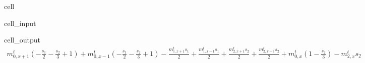 \documentclass[letterpaper,10pt,english,openany,oneside]{jupyterBook}
\begin{document}
\begin{sphinxuseclass}{cell}
\begin{sphinxVerbatimInput}
\begin{sphinxuseclass}{cell_input}
\begin{sphinxVerbatim}[commandchars=\\\{\}]
           \PYG{p}{[}\PYG{p}{]}\PYG{p}{[}\PYG{p}{]}\PYG{p}{[}\PYG{p}{]}\PYG{p}{[}\PYG{p}{]}\PYG{p}{[}\PYG{p}{]}\PYG{p}{[}\PYG{p}{]}
\end{sphinxVerbatim}

\end{sphinxuseclass}\end{sphinxVerbatimInput}
\begin{sphinxVerbatimOutput}

\begin{sphinxuseclass}{cell_output}\begin{equation*}
\begin{split}\displaystyle m^{t}_{0,x+1} \left(- \frac{s_{1}}{2} - \frac{s_{2}}{3} + 1\right) + m^{t}_{0,x-1} \left(- \frac{s_{1}}{2} - \frac{s_{2}}{3} + 1\right) - \frac{m^{t}_{1,x+1} s_{1}}{2} + \frac{m^{t}_{1,x-1} s_{1}}{2} + \frac{m^{t}_{2,x+1} s_{2}}{2} + \frac{m^{t}_{2,x-1} s_{2}}{2} + m_{0,x}^{t} \left(1 - \frac{s_{2}}{3}\right) - m_{2,x}^{t} s_{2}\end{split}
\end{equation*}
\end{sphinxuseclass}\end{sphinxVerbatimOutput}

\end{sphinxuseclass}
\end{document}
